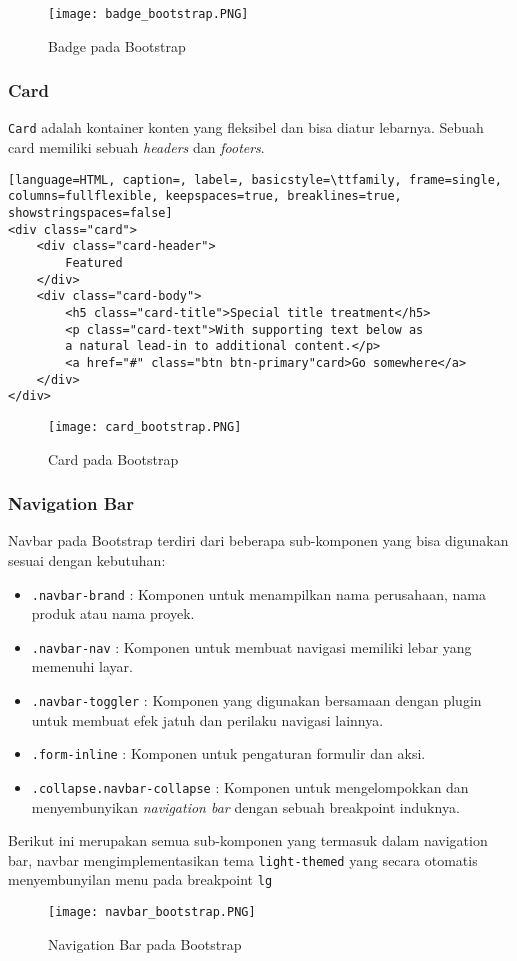 \begin{figure} [H]
	\centering  
	\texttt{[image: badge\_bootstrap.PNG]}  
	\caption{Badge pada Bootstrap} 
\end{figure}

\subsubsection{Card}
\texttt{Card} adalah kontainer konten yang fleksibel dan bisa diatur lebarnya. Sebuah card memiliki sebuah \textit{headers} dan \textit{footers}.

\begin{lstlisting}[language=HTML, caption=, label=, basicstyle=\ttfamily, frame=single, columns=fullflexible, keepspaces=true, breaklines=true, showstringspaces=false] 
<div class="card">
	<div class="card-header">
		Featured
	</div>
	<div class="card-body">
		<h5 class="card-title">Special title treatment</h5>
		<p class="card-text">With supporting text below as 
		a natural lead-in to additional content.</p>
		<a href="#" class="btn btn-primary"card>Go somewhere</a>
	</div>
</div>
\end{lstlisting}

\begin{figure} [H]
	\centering  
	\texttt{[image: card\_bootstrap.PNG]}  
	\caption{Card pada Bootstrap} 
\end{figure}

\subsubsection{Navigation Bar}
Navbar pada Bootstrap terdiri dari beberapa sub-komponen yang bisa digunakan sesuai dengan kebutuhan:
\begin{itemize}
    \item \texttt{.navbar-brand} : Komponen untuk menampilkan nama perusahaan, nama produk atau nama proyek.
    \item \texttt{.navbar-nav} : Komponen untuk membuat navigasi memiliki lebar yang memenuhi layar.
    \item \texttt{.navbar-toggler} : Komponen yang digunakan bersamaan dengan plugin untuk membuat efek jatuh dan perilaku navigasi lainnya.
    \item \texttt{.form-inline} : Komponen untuk pengaturan formulir dan aksi.
    \item \texttt{.collapse.navbar-collapse} : Komponen untuk mengelompokkan dan menyembunyikan \textit{navigation bar} dengan sebuah breakpoint induknya.
\end{itemize}
Berikut ini merupakan semua sub-komponen yang termasuk dalam navigation bar, navbar mengimplementasikan tema \texttt{light-themed} yang secara otomatis menyembunyilan menu pada breakpoint \texttt{lg}
\begin{figure} [H]
	\centering  
	\texttt{[image: navbar\_bootstrap.PNG]}  
	\caption{Navigation Bar pada Bootstrap} 
\end{figure}

